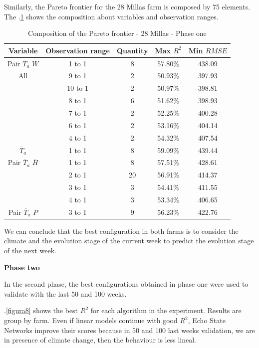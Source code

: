 \documentclass[review,authoryear,english]{elsarticle}
\begin{document}
Similarly, the Pareto frontier for the 28 Millas farm is composed by 75 elements. The \tablename $.$\ref{tabla3} shows the composition about variables and observation ranges.

\begin{table}[h] 
\caption{Composition of the Pareto frontier - 28 Millas - Phase one} 
\label{tabla3} 
\centering
\begin{tabular}{c|c|c|c|c} 
\hline
\bfseries Variable & \bfseries Observation range & \bfseries Quantity & \bfseries Max $R^2$ & \bfseries Min $RMSE$\\ 
\hline\hline 
Pair $\overline{T}_{a}$ $\overline{W}$ & 1 to 1 & 8 & 57.80\% & 438.09 \\
\hline 
All   &	9 to 1 & 2 & 50.93\% & 397.93 \\
  & 10 to 1	 & 2 & 50.97\% & 398.81 \\
  &	8 to 1 & 6 & 51.62\% & 398.93 \\
  &	7 to 1 & 2 & 52.25\% & 400.28 \\
  &	6 to 1 & 2 & 53.16\% & 404.14 \\
  &	4 to 1 & 2 & 54.32\% & 407.54 \\
\hline    
$\overline{T}_{a}$ & 1 to 1  & 8  & 59.09\% & 439.44 \\
\hline
Pair $\overline{T}_{a}$ $\overline{H}$ & 1 to 1	 & 8 & 57.51\% & 428.61 \\
 &	2 to 1 & 20 & 56.91\% & 414.37 \\
 &	3 to 1 & 3 & 54.41\% & 411.55 \\
 &	4 to 1 & 3 & 53.34\% & 406.65 \\
\hline
Pair $\overline{T}_{a}$ $P$ & 3 to 1 & 9 & 56.23\% & 422.76 \\
\hline
\end{tabular} 
\end{table}

We can conclude that the best configuration in both farms is to consider the climate and the evolution stage of the current week to predict the evolution stage of the next week.


{\bf Phase two }

In the second phase, the best configurations obtained in phase one were used to validate with the last 50 and 100 weeks. 


\figurename $.$\ref{figura8} shows the best $R^2$ for each algorithm in the experiment. Results are group by farm. Even if linear models continue with good $R^2$, Echo State Networks improve their scores because in $50$ and $100$ last weeks validation, we are in presence of climate change, then the behaviour is less lineal.
\end{document}
